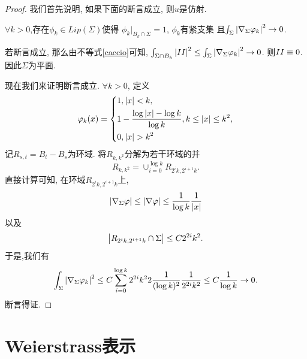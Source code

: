 \begin{proof}
    我们首先说明, 如果下面的断言成立, 则$u$是仿射.
    \begin{claim}
        $\forall k >0$,存在$\phi_k \in Lip(\Sigma)$使得  $\phi_k|_{B_k \cap \Sigma}=1$, $\phi_k$有紧支集 且$ \int_\Sigma \left | \nabla_\Sigma \varphi_k \right |^2 \to 0$.
    \end{claim}
    若断言成立, 那么由不等式\eqref{caccio}可知, $\int_{\Sigma\cap B_k} \left | II \right |^2 \le \int_\Sigma \left | \nabla_\Sigma \varphi_k \right |^2 \to 0$. 则$II\equiv 0$. 因此$\Sigma$为平面. 
    \par 现在我们来证明断言成立. $\forall k>0$, 定义
    \begin{equation}
        \varphi_k(x)=\left\{
            \begin{aligned}
                &1, \left | x \right | < k, \\
                &1-\frac{\log\left | x \right |-\log k}{\log k}, k \le \left | x \right | \le k^2,\\
                &0, \left | x \right | > k^2
            \end{aligned}
        \right.
    \end{equation}
    记$R_{s,t}=B_t-B_s$为环域. 将$R_{k,k^2}$分解为若干环域的并 
    \begin{equation}
        R_{k,k^2}=\cup_{i=0}^{\log k} R_{2^ik,2^{i+1}k}.
    \end{equation}
    直接计算可知, 在环域$R_{2^ik,2^{i+1}k}$上,
    \begin{equation}
        \left | \nabla_\Sigma \varphi \right | \le \left | \nabla \varphi \right | \le \frac{1}{\log k} \frac{1}{\left | x \right |}
    \end{equation}
    以及
    \begin{equation}
        \left | R_{2^ik,2^{i+1}k} \cap \Sigma  \right | \le C 2^{2i}k^2. 
    \end{equation}
    于是,我们有
    \begin{equation}
        \int_\Sigma \left | \nabla_\Sigma \varphi_k \right |^2 \le C\sum_{i=0}^{\log k} 2^{2i}k^22\frac{1}{(\log k)^2} \frac{1}{2^{2i}k^2} \le C\frac{1}{\log k} \to 0.
    \end{equation}
    断言得证.
\end{proof}
\section{Weierstrass表示}